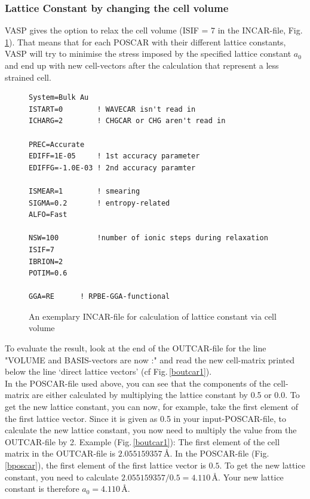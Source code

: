 \documentclass[twoside, 11pt, titlepage, captions=nooneline, a4paper, headsepline]{scrbook}%
\begin{document}
\subsubsection*{Lattice Constant by changing the cell volume}
VASP gives the option to relax the cell volume (ISIF = 7 in the INCAR-file, Fig.\,\ref{bincar1}). That means that for each POSCAR with their different lattice constants, VASP will try to minimise the stress imposed by the specified lattice constant $a_0$ and end up with new cell-vectors after the calculation that represent a less strained cell.
\begin{figure}[h!]
\begin{verbatim}
System=Bulk Au
ISTART=0		! WAVECAR isn't read in
ICHARG=2		! CHGCAR or CHG aren't read in

PREC=Accurate
EDIFF=1E-05		! 1st accuracy parameter
EDIFFG=-1.0E-03	! 2nd accuracy paramter

ISMEAR=1		! smearing
SIGMA=0.2		! entropy-related
ALFO=Fast

NSW=100			!number of ionic steps during relaxation
ISIF=7
IBRION=2
POTIM=0.6

GGA=RE		! RPBE-GGA-functional
\end{verbatim}
\caption{An exemplary INCAR-file for calculation of lattice constant via cell volume}
\label{bincar1}
\end{figure}
To evaluate the result, look at the end of the OUTCAR-file for the line "VOLUME and BASIS-vectors are now :" and read the new cell-matrix printed below the line `direct lattice vectors' (cf Fig.\,\ref{boutcar1}).\\
In the POSCAR-file used above, you can see that the components of the cell-matrix are either calculated by multiplying the lattice constant by 0.5 or 0.0. To get the new lattice constant, you can now, for example, take the first element of the first lattice vector. Since it is given as 0.5 in your input-POSCAR-file, to calculate the new lattice constant, you now need to multiply the value from the OUTCAR-file by 2. Example (Fig.\,\ref{boutcar1}): The first element of the cell matrix in the OUTCAR-file is $2.055159357$\,\AA. In the POSCAR-file (Fig.\,\ref{bposcar}), the first element of the first lattice vector is $0.5$. To get the new lattice constant, you need to calculate $2.055159357/0.5=4.110$\,\AA. Your new lattice constant is therefore $a_0=4.110$\,\AA.
\end{document}

